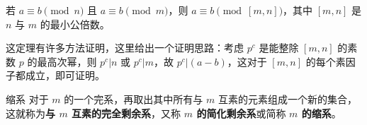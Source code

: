 \begin{theorem}{}
若 $a \equiv b \pmod n$ 且 $a \equiv b \pmod m$，则 $a \equiv b \pmod{[m, n]}$，其中 $[m, n]$ 是 $n$ 与 $m$ 的最小公倍数。
\end{theorem}
这定理有许多方法证明，这里给出一个证明思路：考虑 $p^c$ 是能整除 $[m, n]$ 的素数 $p$ 的最高次幂，则 $p^c | n$ 或 $p^c | m$，故 $p^c | (a - b)$，这对于 $[m, n]$ 的每个素因子都成立，即可证明。

\begin{definition}{缩系}
对于 $m$ 的一个完系，再取出其中所有与 $m$ 互素的元素组成一个新的集合，这就称为\textbf{与 $m$ 互素的完全剩余系}，又称\textbf{ $m$ 的简化剩余系}或简称 \textbf{$m$ 的缩系}。
\end{definition}